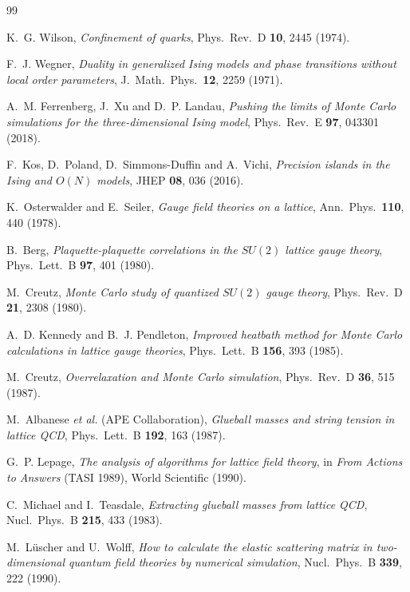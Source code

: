 \documentclass[aps,prl,reprint,superscriptaddress,nofootinbib]{revtex4-2}
\begin{document}
\begin{thebibliography}{99}

K.~G. Wilson, \emph{Confinement of quarks},
Phys.\ Rev.\ D \textbf{10}, 2445 (1974).

F.~J. Wegner, \emph{Duality in generalized Ising models and phase transitions
without local order parameters},
J.\ Math.\ Phys.\ \textbf{12}, 2259 (1971).

A.~M. Ferrenberg, J.~Xu and D.~P. Landau, \emph{Pushing the limits of Monte
Carlo simulations for the three-dimensional Ising model},
Phys.\ Rev.\ E \textbf{97}, 043301 (2018).

F.~Kos, D.~Poland, D.~Simmons-Duffin and A.~Vichi, \emph{Precision islands in
the Ising and $O(N)$ models},
JHEP \textbf{08}, 036 (2016).

K.~Osterwalder and E.~Seiler, \emph{Gauge field theories on a lattice},
Ann.\ Phys.\ \textbf{110}, 440 (1978).

B.~Berg, \emph{Plaquette-plaquette correlations in the $SU(2)$ lattice gauge
theory}, Phys.\ Lett.\ B \textbf{97}, 401 (1980).

M.~Creutz, \emph{Monte Carlo study of quantized $SU(2)$ gauge theory},
Phys.\ Rev.\ D \textbf{21}, 2308 (1980).

A.~D. Kennedy and B.~J. Pendleton, \emph{Improved heatbath method for Monte
Carlo calculations in lattice gauge theories},
Phys.\ Lett.\ B \textbf{156}, 393 (1985).

M.~Creutz, \emph{Overrelaxation and Monte Carlo simulation},
Phys.\ Rev.\ D \textbf{36}, 515 (1987).

M.~Albanese \emph{et al.} (APE Collaboration), \emph{Glueball masses and string
tension in lattice QCD}, Phys.\ Lett.\ B \textbf{192}, 163 (1987).

G.~P. Lepage, \emph{The analysis of algorithms for lattice field theory}, in
\emph{From Actions to Answers} (TASI 1989), World Scientific (1990).

C.~Michael and I.~Teasdale, \emph{Extracting glueball masses from lattice QCD},
Nucl.\ Phys.\ B \textbf{215}, 433 (1983).

M.~L\"uscher and U.~Wolff, \emph{How to calculate the elastic scattering matrix
in two-dimensional quantum field theories by numerical simulation},
Nucl.\ Phys.\ B \textbf{339}, 222 (1990).


\end{thebibliography}
\end{document}
